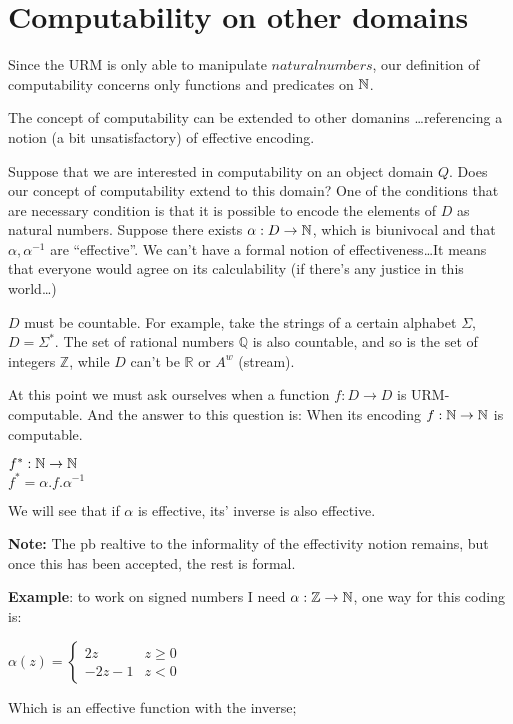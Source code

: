 \chapter{Computability on other domains}
Since the URM is only able to manipulate $natural numbers$, our definition of computability concerns only functions and predicates on $\mathbb{N}$.

The concept of computability can be extended to other domanins \dots referencing a notion (a bit unsatisfactory) of effective encoding.

Suppose that we are interested in computability on an object domain $Q$. Does our concept of computability extend to this domain? One of the conditions that are  necessary condition is that it is possible to encode the elements of $D$ as natural numbers. Suppose there exists $ \alpha: D \rightarrow \mathbb{N} $, which is biunivocal and that $ \alpha, \alpha^{-1} $ are ``effective''. We can't have a formal notion of effectiveness\dots It means that everyone would agree on its calculability (if there's any justice in this world\dots)

$D$ must be countable. For example, take the strings of a certain alphabet $ \Sigma $, $ D = \Sigma^* $. The set of rational numbers $ \mathbb{Q} $ is also countable, and so is the set of integers $\mathbb{Z}$, while $D$ can't be  $ \mathbb{R} $ or $A^w$ (stream).

At this point we must ask ourselves when a function $ f: D \rightarrow D $ is URM-computable. And the answer to this question is: When its encoding $ f: \mathbb{N} \rightarrow \mathbb{N} $ is computable.

$ f^*: \mathbb{N} \rightarrow \mathbb{N} $\\
$ f^* = \alpha . f . \alpha^{-1} $

We will see that if $\alpha$ is effective, its' inverse is also effective.

\textbf{Note:} The pb realtive to the informality of the effectivity notion remains, but once this has been accepted, the rest is formal.

\textbf{Example}: to work on signed numbers I need $ \alpha: \mathbb{Z} \rightarrow \mathbb{N} $, one way for this coding is:

$ \alpha(z) = \begin{cases}
  2z    & z \geq 0 \\
  -2z-1 & z < 0
\end{cases} $

Which is an effective function with the inverse;

